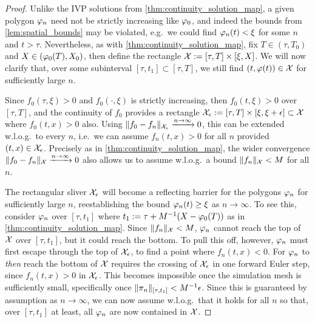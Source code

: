 \begin{proof}
    Unlike the IVP solutions from \autoref{thm:continuity_solution_map}, a given polygon $\varphi_n$ need not be strictly increasing like $\varphi_0$, and indeed the bounds from \autoref{lem:spatial_bounds} may be violated, e.g.~we could find $\varphi_n(t)<\xi$ for some $n$ and $t>\tau$. Nevertheless, as with \autoref{thm:continuity_solution_map}, fix $T\in(\tau,T_0)$ and $X\in(\varphi_0(T),X_0)$, then define the rectangle $\mathcal{X}:=[\tau,T]\times[\xi,X]$. We will now clarify that, over some subinterval $[\tau,t_1]\subset[\tau,T]$, we still find $(t,\varphi(t))\in\mathcal{X}$ for sufficiently large $n$.

    Since $f_0(\tau,\xi)>0$ and $f_0(\cdot,\xi)$ is strictly increasing, then $f_0(t,\xi)>0$ over $[\tau,T]$, and the continuity of $f_0$ provides a rectangle $\mathcal{X}_\epsilon:=[\tau,T]\times[\xi,\xi+\epsilon]\subset\mathcal{X}$ where $f_0(t,x)>0$ also. Using $\Vert f_0 - f_n \Vert_{\mathcal{X}_\epsilon}\xrightarrow{n\to\infty}0$, this can be extended w.l.o.g.~to every $n$, i.e.~we can assume $f_n(t,x)>0$ for all $n$ provided $(t,x)\in\mathcal{X}_\epsilon$. Precisely as in \autoref{thm:continuity_solution_map}, the wider convergence $\Vert f_0 - f_n \Vert_{\mathcal{X}} \xrightarrow{n\to\infty}0$ also allows us to assume w.l.o.g.~a bound $\Vert f_n \Vert_{\mathcal{X}}<M$ for all $n$.

    The rectangular sliver $\mathcal{X}_\epsilon$ will become a reflecting barrier for the polygons $\varphi_n$ for sufficiently large $n$, reestablishing the bound $\varphi_n(t)\ge\xi$ as $n\to\infty$. To see this, consider $\varphi_n$ over $[\tau,t_1]$ where $t_1:=\tau+M^{-1}(X-\varphi_0(T))$ as in \autoref{thm:continuity_solution_map}. Since $\Vert f_n \Vert_{\mathcal{X}}<M$, $\varphi_n$ cannot reach the top of $\mathcal{X}$ over $[\tau,t_1]$, but it could reach the bottom. To pull this off, however, $\varphi_n$ must first escape through the top of $\mathcal{X}_\epsilon$, to find a point where $f_n(t,x)<0$. For $\varphi_n$ to \emph{then} reach the bottom of $\mathcal{X}$ requires the crossing of $\mathcal{X}_\epsilon$ in one forward Euler step, since $f_n(t,x)>0$ in $\mathcal{X}_\epsilon$. This becomes impossible once the simulation mesh is sufficiently small, specifically once $\Vert\pi_n\Vert_{[\tau,t_1]}<M^{-1}\epsilon$. Since this is guaranteed by assumption as $n\to\infty$, we can now assume w.l.o.g.~that it holds for all $n$ so that, over $[\tau,t_1]$ at least, all $\varphi_n$ are now contained in $\mathcal{X}$.


\end{proof}
